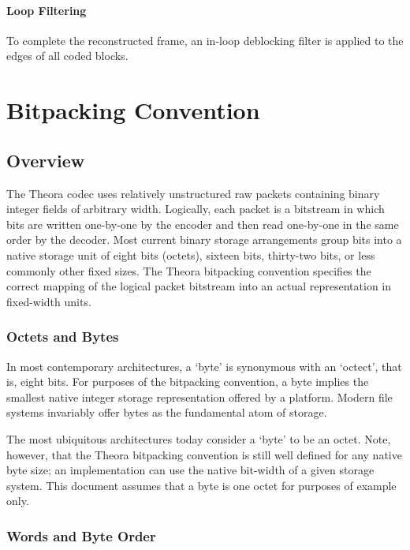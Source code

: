 \documentclass[11pt,letterpaper]{article}
\begin{document}
\paragraph{Loop Filtering}

To complete the reconstructed frame, an in-loop deblocking filter is applied to
 the edges of all coded blocks.

\section{Bitpacking Convention}
\label{sec:bitpacking}

\subsection{Overview}

The Theora codec uses relatively unstructured raw packets containing
 binary integer fields of arbitrary width.
Logically, each packet is a bitstream in which bits are written one-by-one by
 the encoder and then read one-by-one in the same order by the decoder.
Most current binary storage arrangements group bits into a native storage unit
 of eight bits (octets), sixteen bits, thirty-two bits, or less commonly other
 fixed sizes.
The Theora bitpacking convention specifies the correct mapping of the logical
 packet bitstream into an actual representation in fixed-width units.

\subsubsection{Octets and Bytes}

In most contemporary architectures, a `byte' is synonymous with an `octect',
 that is, eight bits.
For purposes of the bitpacking convention, a byte implies the smallest native
 integer storage representation offered by a platform.
Modern file systems invariably offer bytes as the fundamental atom of storage.

The most ubiquitous architectures today consider a `byte' to be an octet.
Note, however, that the Theora bitpacking convention is still well defined for
 any native byte size;
an implementation can use the native bit-width of a given storage
system.
This document assumes that a byte is one octet for purposes of example only.

\subsubsection{Words and Byte Order}
\end{document}
